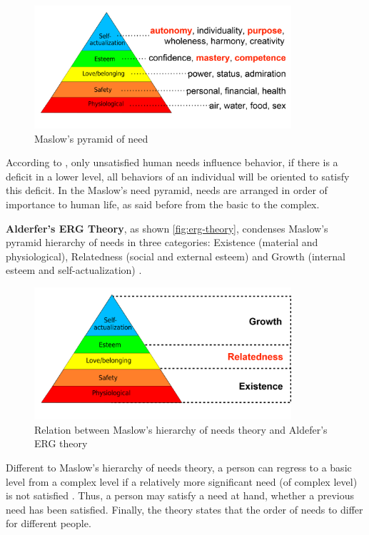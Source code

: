 \begin{figure}[htb]
 \caption{Maslow's pyramid of need}
 \label{fig:maslow-pyramid}
 \centering
 \includegraphics[width=0.85\textwidth]{images/chap-general-background/maslow-pyramid.png}
\end{figure}

According to , only unsatisfied human needs influence behavior, if there is a deficit in a lower level, all behaviors of an individual will be oriented to satisfy this deficit.
In the Maslow's need pyramid, needs are arranged in order of importance to human life, as said before from the basic to the complex. 

\textbf{Alderfer's ERG Theory}, as shown \autoref{fig:erg-theory}, condenses Maslow’s pyramid hierarchy of needs in three categories: Existence (material and physiological), Relatedness (social and external esteem) and Growth (internal esteem and self-actualization) \cite{Alderfer1969,Alderfer1972}.

\begin{figure}[htb]
 \caption{Relation between Maslow's hierarchy of needs theory and Aldefer's ERG theory}
 \label{fig:erg-theory}
 \centering
 \includegraphics[width=0.85\textwidth]{images/chap-general-background/erg-theory.png}
 \fautor
\end{figure}


Different to Maslow's hierarchy of needs theory, a person can regress to a basic level from a complex level if a relatively more significant need (of complex level) is not satisfied \cite{Alderfer1972}.
Thus, a person may satisfy a need at hand, whether a previous need has been satisfied.
Finally, the theory states that the order of needs to differ for different people.

